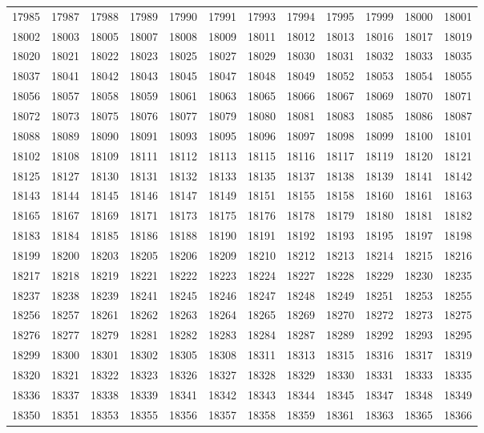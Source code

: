 \begin{center}
\begin{longtable}{llllllllllll}
17985 &17987 &17988 &17989 &17990 &17991 &17993 &17994 &17995 &17999 &18000 &18001 \\
18002 &18003 &18005 &18007 &18008 &18009 &18011 &18012 &18013 &18016 &18017 &18019 \\
18020 &18021 &18022 &18023 &18025 &18027 &18029 &18030 &18031 &18032 &18033 &18035 \\
18037 &18041 &18042 &18043 &18045 &18047 &18048 &18049 &18052 &18053 &18054 &18055 \\
18056 &18057 &18058 &18059 &18061 &18063 &18065 &18066 &18067 &18069 &18070 &18071 \\
18072 &18073 &18075 &18076 &18077 &18079 &18080 &18081 &18083 &18085 &18086 &18087 \\
18088 &18089 &18090 &18091 &18093 &18095 &18096 &18097 &18098 &18099 &18100 &18101 \\
18102 &18108 &18109 &18111 &18112 &18113 &18115 &18116 &18117 &18119 &18120 &18121 \\
18125 &18127 &18130 &18131 &18132 &18133 &18135 &18137 &18138 &18139 &18141 &18142 \\
18143 &18144 &18145 &18146 &18147 &18149 &18151 &18155 &18158 &18160 &18161 &18163 \\
18165 &18167 &18169 &18171 &18173 &18175 &18176 &18178 &18179 &18180 &18181 &18182 \\
18183 &18184 &18185 &18186 &18188 &18190 &18191 &18192 &18193 &18195 &18197 &18198 \\
18199 &18200 &18203 &18205 &18206 &18209 &18210 &18212 &18213 &18214 &18215 &18216 \\
18217 &18218 &18219 &18221 &18222 &18223 &18224 &18227 &18228 &18229 &18230 &18235 \\
18237 &18238 &18239 &18241 &18245 &18246 &18247 &18248 &18249 &18251 &18253 &18255 \\
18256 &18257 &18261 &18262 &18263 &18264 &18265 &18269 &18270 &18272 &18273 &18275 \\
18276 &18277 &18279 &18281 &18282 &18283 &18284 &18287 &18289 &18292 &18293 &18295 \\
18299 &18300 &18301 &18302 &18305 &18308 &18311 &18313 &18315 &18316 &18317 &18319 \\
18320 &18321 &18322 &18323 &18326 &18327 &18328 &18329 &18330 &18331 &18333 &18335 \\
18336 &18337 &18338 &18339 &18341 &18342 &18343 &18344 &18345 &18347 &18348 &18349 \\
18350 &18351 &18353 &18355 &18356 &18357 &18358 &18359 &18361 &18363 &18365 &18366 \\

\end{longtable}
\end{center}
